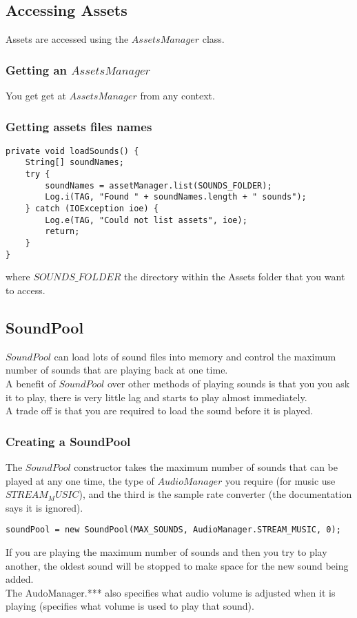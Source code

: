\documentclass[]{article}
\begin{document}
\subsection{Accessing Assets}
Assets are accessed using the $AssetsManager$ class.
\subsubsection{Getting an $AssetsManager$}
You get get at $AssetsManager$ from any context.

\subsubsection{Getting assets files names}
\begin{lstlisting}
private void loadSounds() {
	String[] soundNames;
	try {
		soundNames = assetManager.list(SOUNDS_FOLDER);
		Log.i(TAG, "Found " + soundNames.length + " sounds");
	} catch (IOException ioe) {
		Log.e(TAG, "Could not list assets", ioe);
		return;
	}
}
\end{lstlisting}
where $SOUNDS\_FOLDER$ the directory within the Assets folder that you want to access.

\subsection{SoundPool}
$SoundPool$ can load lots of sound files into memory and control the maximum number of sounds that are playing back at one time.
\\
A benefit of $SoundPool$ over other methods of playing sounds is that you you ask it to play, there is very little lag and starts to play almost immediately.
\\
A trade off is that you are required to load the sound before it is played.
\subsubsection{Creating a SoundPool}
The $SoundPool$ constructor takes the maximum number of sounds that can be played at any one time, the type of $AudioManager$ you require (for music use $STREAM_MUSIC$), and the third is the sample rate converter (the documentation says it is ignored).
\begin{lstlisting}
soundPool = new SoundPool(MAX_SOUNDS, AudioManager.STREAM_MUSIC, 0);
\end{lstlisting}
If you are playing the maximum number of sounds and then you try to play another, the oldest sound will be stopped to make space for the new sound being added.
\\
The AudoManager.*** also specifies what audio volume is adjusted when it is playing (specifies what volume is used to play that sound).
\end{document}
